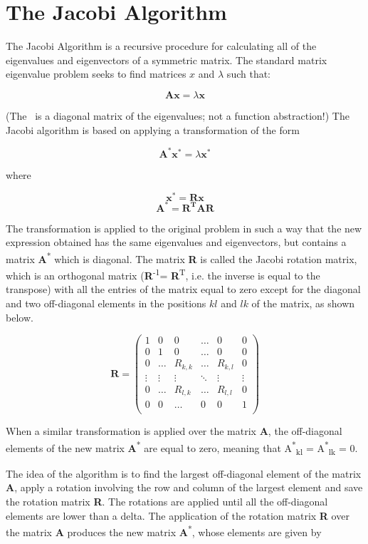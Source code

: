 \documentclass{tmr}
\begin{document}
\section{The Jacobi Algorithm}

The Jacobi Algorithm is a recursive procedure for calculating all of the
eigenvalues and eigenvectors of a symmetric matrix.
%
The standard matrix eigenvalue problem seeks to find matrices $x$ and $\lambda$
such that:

\[\mathbf{Ax} = \lambda \mathbf{x}  \]

(The \textlambda\ is a diagonal matrix of the eigenvalues; not a
function abstraction!)
%
The Jacobi algorithm is based on applying a transformation of the form

\[\mathbf{A^*x^*} = \lambda \mathbf{x^*}  \]

where

\[\mathbf{x^*} = \mathbf{Rx} \]
\[\mathbf{A^*} = \mathbf{R^TAR} \]

The transformation is applied to the original problem in such a way that
the new expression obtained has the same eigenvalues and eigenvectors,
but contains a matrix {\textbf A\textsuperscript{*}} which is diagonal.
%
The matrix {\bf R} is called the Jacobi rotation matrix,
which is an orthogonal matrix ({\textbf R\textsuperscript{-1}}= {\textbf
R\textsuperscript{T}}, i.e. the inverse is equal to the transpose) with
all the entries of the matrix equal to zero except for the diagonal and
two off-diagonal elements in the positions $kl$ and $lk$ of the matrix,
as shown below.

\[
 \mathbf{R} =
\begin{pmatrix}
1 & 0 & 0 & \hdots & 0 & 0 \\
0 & 1 & 0 & \hdots & 0 & 0 \\
0 & \hdots & R_{k,k} & \hdots & R_{k,l} &  0 \\ 
\vdots & \vdots & \vdots & \ddots & \vdots & \vdots \\
0 &  \hdots & R_{l,k} & \hdots & R_{l,l} & 0 \\
0 & 0 & \hdots & 0 & 0 & 1 \\ 
\end{pmatrix}
\]

When a similar transformation is applied over the matrix
{\textbf A}, the off-diagonal elements of the new matrix {\textbf A\textsuperscript{*}} are equal
to zero, meaning that 
{A\textsuperscript{*}\textsubscript{kl}} = {A\textsuperscript{*}\textsubscript{lk}} = 0.

The idea of the algorithm is to find the largest off-diagonal element of
the matrix \textbf{A}, apply a rotation involving the row and column of
the largest element and save the rotation matrix \textbf{R}.
%
The rotations are applied until all the off-diagonal elements are lower
than a delta.
%
The application of the rotation matrix \textbf{R} over the matrix
\textbf{A} produces the new matrix {\textbf A\textsuperscript{*}}, whose
elements are given by
\end{document}
